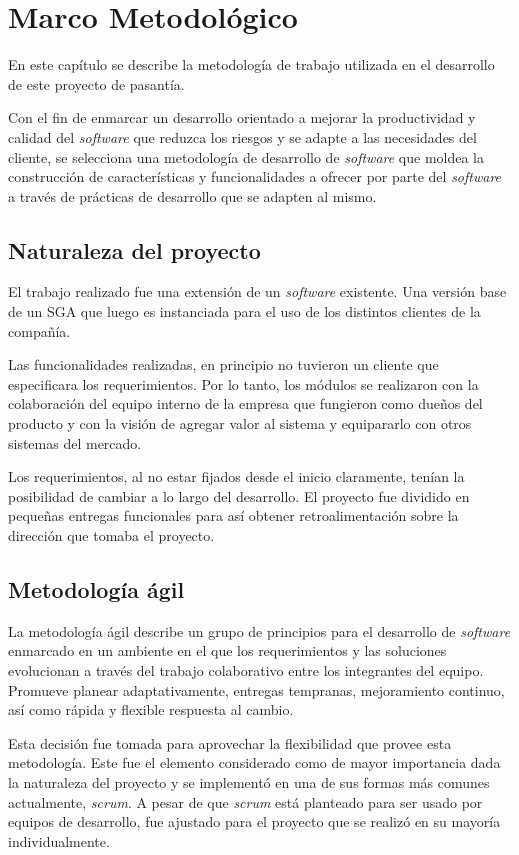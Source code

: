 \chapter{Marco Metodológico}
\thispagestyle{empty} %

En este capítulo se describe la metodología de trabajo utilizada en el desarrollo de este proyecto de pasantía.

Con el fin de enmarcar un desarrollo orientado a mejorar la productividad y calidad del \emph{software} que reduzca los riesgos y se adapte a las necesidades del cliente, se selecciona una metodología de desarrollo de \emph{software} que moldea la construcción de características y funcionalidades a ofrecer por parte del \emph{software} a través de prácticas de desarrollo que se adapten al mismo.

\section{Naturaleza del proyecto}
El trabajo realizado fue una extensión de un \emph{software} existente. Una versión base de un \gls{SGA} que luego es instanciada para el uso de los distintos clientes de la compañía. 

Las funcionalidades realizadas, en principio no tuvieron un cliente que especificara los requerimientos. Por lo tanto, los módulos se realizaron con la colaboración del equipo interno de la empresa que fungieron como dueños del producto y con la visión de agregar valor al sistema y equipararlo con otros sistemas del mercado.

Los requerimientos, al no estar fijados desde el inicio claramente, tenían la posibilidad de cambiar a lo largo del desarrollo. El proyecto fue dividido en pequeñas entregas funcionales para así obtener retroalimentación sobre la dirección que tomaba el proyecto.

\section{Metodología ágil}

La metodología ágil describe un grupo de principios para el desarrollo de \emph{software} enmarcado en un ambiente en el que los requerimientos y las soluciones evolucionan a través del trabajo colaborativo entre los integrantes del equipo. Promueve planear adaptativamente, entregas tempranas, mejoramiento continuo, así como rápida y flexible respuesta al cambio.

Esta decisión fue tomada para aprovechar la flexibilidad que provee esta metodología. Este fue el elemento considerado como de mayor importancia dada la naturaleza del proyecto y se implementó en una de sus formas más comunes actualmente, \emph{scrum}. A pesar de que \emph{scrum} está planteado para ser usado por equipos de desarrollo, fue ajustado para el proyecto que se realizó en su mayoría individualmente.


